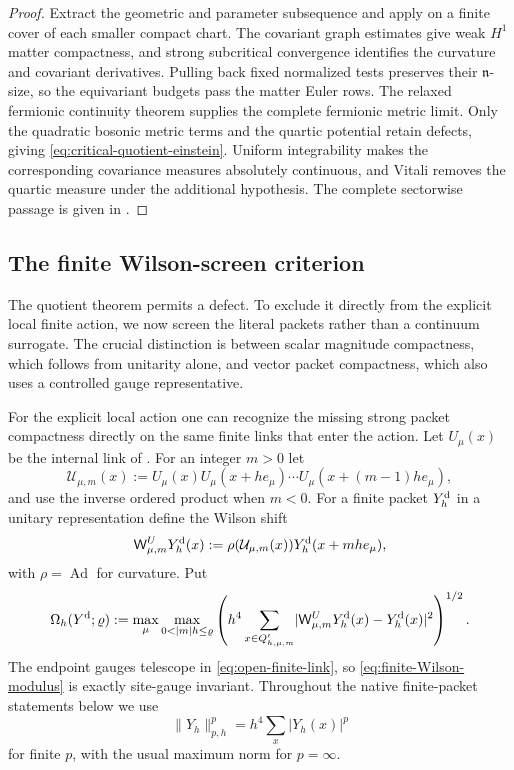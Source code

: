 \documentclass[11pt]{article}
\numberwithin{equation}{section}
\theoremstyle{definition}
\theoremstyle{remark}
\newcommand{\norm}[1]{\lVert#1\rVert}
\newcommand{\abs}[1]{\lvert#1\rvert}
\begin{document}
\begin{proof}
Extract the geometric and parameter subsequence and apply
 on a finite cover of each smaller compact
chart. The covariant graph estimates give weak $H^1$ matter compactness,
and strong subcritical convergence identifies the curvature and covariant
derivatives. Pulling back fixed normalized tests preserves their
$\mathfrak n$-size, so the equivariant budgets pass the matter Euler rows.
The relaxed fermionic continuity theorem supplies the complete fermionic
metric limit. Only the quadratic bosonic metric terms and the quartic
potential retain defects, giving \eqref{eq:critical-quotient-einstein}.
Uniform integrability makes the corresponding covariance measures
absolutely continuous, and Vitali removes the quartic measure under the
additional hypothesis. The complete sectorwise passage is given in
.
\end{proof}

\subsection{The finite Wilson-screen criterion}
\label{subsec:finite-Wilson}

The quotient theorem permits a defect. To exclude it directly from the
explicit local finite action, we now screen the literal packets rather
than a continuum surrogate. The crucial distinction is between scalar
magnitude compactness, which follows from unitarity alone, and vector
packet compactness, which also uses a controlled gauge representative.

For the explicit local action one can recognize the missing strong packet
compactness directly on the same finite links that enter the action.  Let
$U_\mu(x)$ be the internal link of .  For an integer
$m>0$ let
\begin{equation}
 \mathcal U_{\mu,m}(x)
 :=U_\mu(x)U_\mu(x+h e_\mu)\cdots
   U_\mu(x+(m-1)h e_\mu),
 \label{eq:open-finite-link}
\end{equation}
and use the inverse ordered product when $m<0$.  For a finite packet $Y_h^{\rm d}$
in a unitary representation define the Wilson shift
\begin{equation}
 \mathsf W^U_{\mu,m}Y_h^{\rm d}(x)
 :=\rho(\mathcal U_{\mu,m}(x))Y_h^{\rm d}(x+mhe_\mu),
 \label{eq:finite-Wilson-shift}
\end{equation}
with $\rho=\operatorname{Ad}$ for curvature.  Put
\begin{equation}
 \Omega_h(Y^{\rm d};\varrho)
 :=\max_\mu\max_{0<|m|h\le\varrho}
 \left(
 h^4\sum_{x\in Q'_{h,\mu,m}}
 \abs{\mathsf W^U_{\mu,m}Y_h^{\rm d}(x)-Y_h^{\rm d}(x)}^2
 \right)^{1/2}.
 \label{eq:finite-Wilson-modulus}
\end{equation}
The endpoint gauges telescope in \eqref{eq:open-finite-link}, so
\eqref{eq:finite-Wilson-modulus} is exactly site-gauge invariant.
Throughout the native finite-packet statements below we use
\begin{equation}
 \norm{Y_h}_{p,h}^p=h^4\sum_x|Y_h(x)|^p
 \label{eq:native-lp-main}
\end{equation}
for finite $p$, with the usual maximum norm for $p=\infty$.
\end{document}
